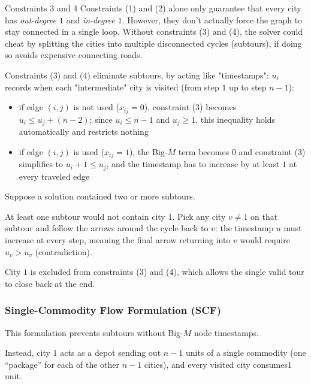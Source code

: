 \documentclass[a4paper, 11pt]{report}
\begin{document}
\begin{gframe}{Constraints 3 and 4}
Constraints (1) and (2) alone only guarantee that every city has \textit{out-degree $1$} and \textit{in-degree $1$}. However, they don't actually force the graph to stay connected in a single loop. Without constraints (3) and (4), the solver could cheat by splitting the cities into multiple disconnected cycles (subtours), if doing so avoids expensive connecting roads.

Constraints (3) and (4) eliminate subtours, by acting like "timestamps": $u_i$ records when each "intermediate" city is visited (from step $1$ up to step $n-1$):
\begin{itemize}
    \item if edge $(i,j)$ is not used ($x_{ij} = 0$), constraint (3) becomes $u_i \leq u_j + (n-2)$; since $u_i \leq n-1$ and $u_j \geq 1$, this inequality holds automatically and restricts nothing
    \item if edge $(i,j)$ is used ($x_{ij} = 1$), the Big-$M$ term becomes $0$ and constraint (3) simplifies to $u_i + 1 \leq u_j$, and the timestamp has to increase by at least $1$ at every traveled edge
\end{itemize}

Suppose a solution contained two or more subtours.

At least one subtour would not contain city $1$. Pick any city $v \neq 1$ on that subtour and follow the arrows around the cycle back to $v$: the timestamp $u$ must increase at every step, meaning the final arrow returning into $v$ would require $u_v > u_v$ (contradiction).

City $1$ is excluded from constraints (3) and (4), which allows the single valid tour to close back at the end.
\end{gframe}

\subsubsection{Single-Commodity Flow Formulation (SCF)}
This formulation prevents subtours without Big-$M$ node timestamps. 

Instead, city $1$ acts as a depot sending out $n-1$ units of a single commodity (one ``package'' for each of the other $n-1$ cities), and every visited city consumes$1$ unit.
\end{document}
